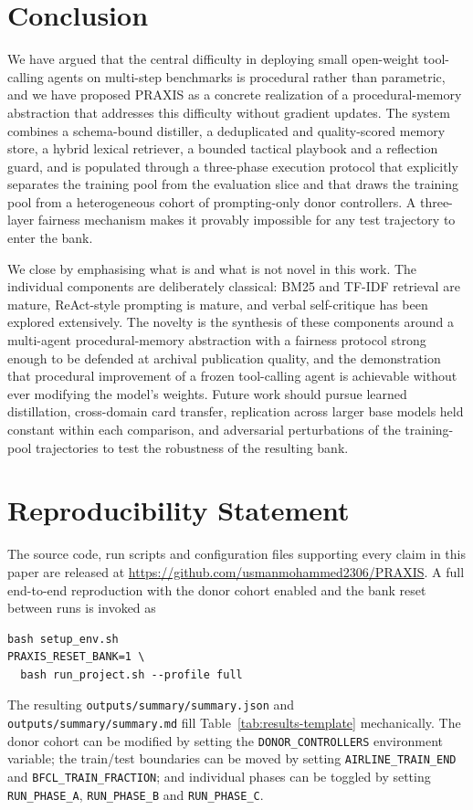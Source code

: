 \documentclass[conference]{IEEEtran}
\begin{document}
\section{Conclusion}

We have argued that the central difficulty in deploying small
open-weight tool-calling agents on multi-step benchmarks is
procedural rather than parametric, and we have proposed PRAXIS as
a concrete realization of a procedural-memory abstraction that
addresses this difficulty without gradient updates. The system
combines a schema-bound distiller, a deduplicated and
quality-scored memory store, a hybrid lexical retriever, a
bounded tactical playbook and a reflection guard, and is
populated through a three-phase execution protocol that
explicitly separates the training pool from the evaluation slice
and that draws the training pool from a heterogeneous cohort of
prompting-only donor controllers. A three-layer fairness
mechanism makes it provably impossible for any test trajectory to
enter the bank.

We close by emphasising what is and what is not novel in this
work. The individual components are deliberately classical: BM25
and TF-IDF retrieval are mature, ReAct-style prompting is mature,
and verbal self-critique has been explored extensively. The
novelty is the synthesis of these components around a
multi-agent procedural-memory abstraction with a fairness
protocol strong enough to be defended at archival publication
quality, and the demonstration that procedural improvement of a
frozen tool-calling agent is achievable without ever modifying
the model's weights. Future work should pursue learned
distillation, cross-domain card transfer, replication across
larger base models held constant within each comparison, and
adversarial perturbations of the training-pool trajectories to
test the robustness of the resulting bank.

\section*{Reproducibility Statement}

The source code, run scripts and configuration files supporting
every claim in this paper are released at
\url{https://github.com/usmanmohammed2306/PRAXIS}. A full
end-to-end reproduction with the donor cohort enabled and the
bank reset between runs is invoked as
\begin{verbatim}
bash setup_env.sh
PRAXIS_RESET_BANK=1 \
  bash run_project.sh --profile full
\end{verbatim}
The resulting \texttt{outputs/summary/summary.json} and
\texttt{outputs/summary/summary.md} fill
Table~\ref{tab:results-template} mechanically. The donor cohort
can be modified by setting the \texttt{DONOR\_CONTROLLERS}
environment variable; the train/test boundaries can be moved by
setting \texttt{AIRLINE\_TRAIN\_END} and
\texttt{BFCL\_TRAIN\_FRACTION}; and individual phases can be
toggled by setting \texttt{RUN\_PHASE\_A},
\texttt{RUN\_PHASE\_B} and \texttt{RUN\_PHASE\_C}.
\end{document}
